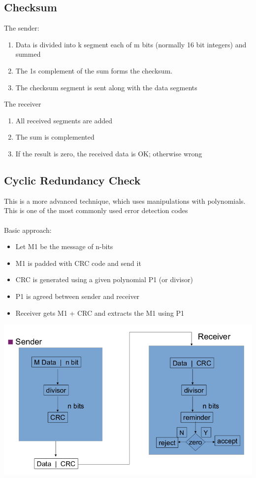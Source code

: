 \documentclass{article}[18pt]
\begin{document}
\subsection{Checksum}
The sender:
\begin{enumerate}
	\item Data is divided into k segment each of m bits (normally 16 bit integers) and summed
	\item The 1s complement of the sum forms the checksum.
	\item The checksum segment is sent along with the data segments
\end{enumerate}
The receiver
\begin{enumerate}
	\item All received segments are added
	\item The sum is complemented
	\item If the result is zero, the received data is OK; otherwise wrong
\end{enumerate}
\subsection{Cyclic Redundancy Check}
This is a more advanced technique, which uses manipulations with polynomials. This is one of the most commonly used error detection codes\\
\\
Basic approach:
\begin{itemize}
	\item Let M1 be the message of n-bits
	\item M1 is padded with CRC code and send it
	\item CRC is generated using a given polynomial P1 (or divisor)
	\item P1 is agreed between sender and receiver
	\item Receiver gets M1 + CRC and extracts the M1 using P1
\end{itemize}
\begin{center}
	\includegraphics[scale=0.7]{CRC}
\end{center}
\end{document}

